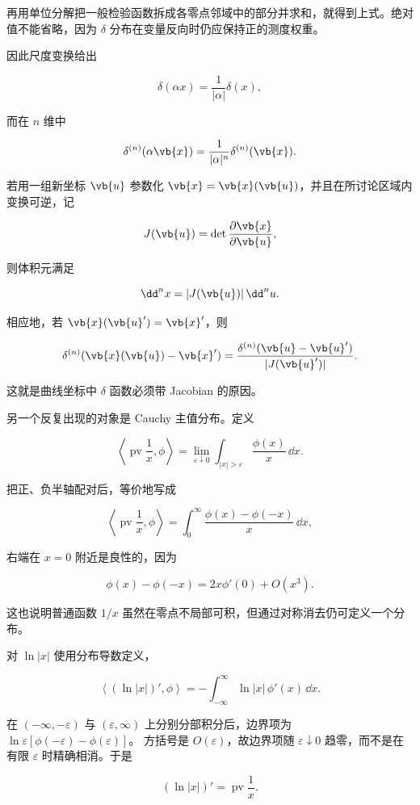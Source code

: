 再用单位分解把一般检验函数拆成各零点邻域中的部分并求和，就得到上式。绝对值不能省略，因为 $\delta$ 分布在变量反向时仍应保持正的测度权重。

因此尺度变换给出

\[
\delta(\alpha x)=\frac1{|\alpha|}\delta(x),
\]

而在 $n$ 维中

\[
{
\delta^{(n)}(\alpha\vb{x})
=\frac1{|\alpha|^n}\delta^{(n)}(\vb{x})
}.
\]

若用一组新坐标 $\vb{u}$ 参数化 $\vb{x}=\vb{x}(\vb{u})$，并且在所讨论区域内变换可逆，记

\[
J(\vb{u})=\det\frac{\partial\vb{x}}{\partial\vb{u}},
\]

则体积元满足

\[
\dd^n x=|J(\vb{u})|\,\dd^n u.
\]

相应地，若 $\vb{x}(\vb{u}')=\vb{x}'$，则

\[
{
\delta^{(n)}(\vb{x}(\vb{u})-\vb{x}')
=\frac{\delta^{(n)}(\vb{u}-\vb{u}')}{|J(\vb{u}')|}
}.
\]

这就是曲线坐标中 $\delta$ 函数必须带 Jacobian 的原因。

另一个反复出现的对象是 Cauchy 主值分布。定义

\begin{equation*}{
\left\langle\operatorname{pv}\frac1x,\phi\right\rangle
=\lim_{\varepsilon\downarrow0}
\int_{|x|>\varepsilon}\frac{\phi(x)}x\,\dd x
}.\end{equation*}

把正、负半轴配对后，等价地写成

\[
\left\langle\operatorname{pv}\frac1x,\phi\right\rangle
=\int_0^\infty\frac{\phi(x)-\phi(-x)}x\,\dd x,
\]

右端在 $x=0$ 附近是良性的，因为

\[
\phi(x)-\phi(-x)=2x\phi'(0)+O(x^3).
\]

这也说明普通函数 $1/x$ 虽然在零点不局部可积，但通过对称消去仍可定义一个分布。

对 $\ln|x|$ 使用分布导数定义，

\[
\left\langle(\ln|x|)',\phi\right\rangle
=-\int_{-\infty}^{\infty}\ln|x|\,\phi'(x)\,\dd x.
\]

在 $(-\infty,-\varepsilon)$ 与 $(\varepsilon,\infty)$ 上分别分部积分后，边界项为
$\ln\varepsilon[\phi(-\varepsilon)-\phi(\varepsilon)]$。
方括号是 $O(\varepsilon)$，故边界项随 $\varepsilon\downarrow0$ 趋零，而不是在有限 $\varepsilon$ 时精确相消。于是

\[
{(\ln|x|)'=\operatorname{pv}\frac1x}.
\]

